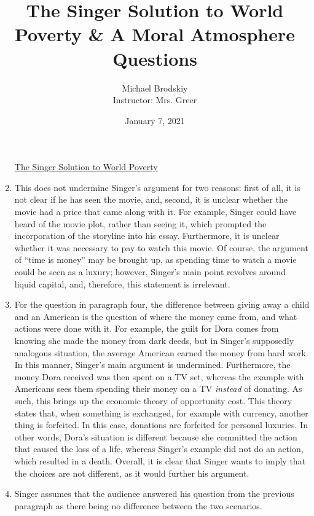 \documentclass[12pt]{article}
\title{The Singer Solution to World Poverty \& A Moral Atmosphere Questions}
\date{January 7, 2021}
\author{Michael Brodskiy\\ \small Instructor: Mrs. Greer}
\begin{document}
\begin{enumerate}

    \maketitle

    \begin{center}
  \underline{The Singer Solution to World Poverty}
    \end{center}

  \item This does not undermine Singer's argument for two reasons: first of all, it is not clear if he has seen the movie, and, second, it is unclear whether the movie had a price that came along with it. For example, Singer could have heard of the movie plot, rather than seeing it, which prompted the incorporation of the storyline into his essay. Furthermore, it is unclear whether it was necessary to pay to watch this movie. Of course, the argument of ``time is money'' may be brought up, as spending time to watch a movie could be seen as a luxury; however, Singer's main point revolves around liquid capital, and, therefore, this statement is irrelevant.

  \item For the question in paragraph four, the difference between giving away a child and an American is the question of where the money came from, and what actions were done with it. For example, the guilt for Dora comes from knowing she made the money from dark deeds, but in Singer's supposedly analogous situation, the average American earned the money from hard work. In this manner, Singer's main argument is undermined. Furthermore, the money Dora received was then spent on a TV set, whereas the example with Americans sees them spending their money on a TV \textit{instead} of donating. As such, this brings up the economic theory of opportunity cost. This theory states that, when something is exchanged, for example with currency, another thing is forfeited. In this case, donations are forfeited for personal luxuries. In other words, Dora's situation is different because she committed the action that caused the loss of a life, whereas Singer's example did not do an action, which resulted in a death. Overall, it is clear that Singer wants to imply that the choices are not different, as it would further his argument.

  \item Singer assumes that the audience answered his question from the previous paragraph as there being no difference between the two scenarios.


\end{enumerate}
\end{document}
